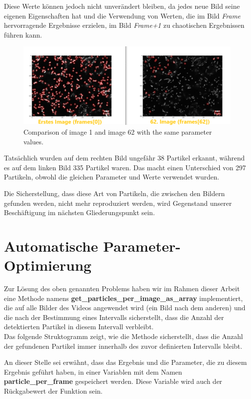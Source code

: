 Diese Werte können jedoch nicht unverändert bleiben, da jedes neue Bild seine eigenen Eigenschaften hat und die Verwendung von Werten, die im Bild \textit{Frame} hervorragende Ergebnisse erzielen, im Bild \textit{Frame+1} zu chaotischen Ergebnissen führen kann.

\begin{figure}[H]
    \centering
    \includegraphics[scale=0.37]{Grafiken/trackpyBilder/comparison_0_Vs_62.png}
    \caption{Comparison of image 1 and image 62 with the same parameter values.}
\end{figure}

Tatsächlich wurden auf dem rechten Bild ungefähr 38 Partikel erkannt, während es auf dem linken Bild 335 Partikel waren. Das macht einen Unterschied von 297 Partikeln, obwohl die gleichen Parameter und Werte verwendet wurden.

Die Sicherstellung, dass diese Art von Partikeln, die zwischen den Bildern gefunden werden, nicht mehr reproduziert werden, wird Gegenstand unserer Beschäftigung im nächsten Gliederungspunkt sein.

\section{Automatische Parameter-Optimierung}
Zur Lösung des oben genannten Problems haben wir im Rahmen dieser Arbeit eine Methode namens \textbf{get\_particles\_per\_image\_as\_array} implementiert, die auf alle Bilder des Videos angewendet wird (ein Bild nach dem anderen) und die nach der Bestimmung eines Intervalls sicherstellt, dass die Anzahl der detektierten Partikel in diesem Intervall verbleibt.\\

Das folgende Struktogramm zeigt, wie die Methode sicherstellt, dass die Anzahl der gefundenen Partikel immer innerhalb des zuvor definierten Intervalls bleibt.

An dieser Stelle sei erwähnt, dass das Ergebnis und die Parameter, die zu diesem Ergebnis geführt haben, in einer Variablen mit dem Namen \textbf{particle\_per\_frame} gespeichert werden.  Diese Variable wird auch der Rückgabewert der Funktion sein. 

